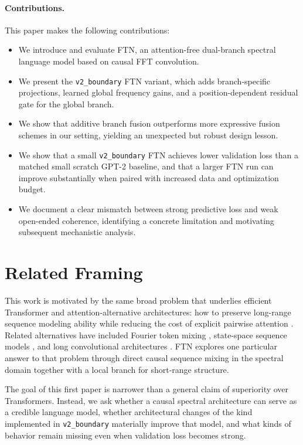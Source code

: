\documentclass[11pt]{article}
\begin{document}
\paragraph{Contributions.}
This paper makes the following contributions:
\begin{itemize}[leftmargin=1.5em]
    \item We introduce and evaluate FTN, an attention-free dual-branch spectral language model based on causal FFT convolution.
    \item We present the \texttt{v2\_boundary} FTN variant, which adds branch-specific projections, learned global frequency gains, and a position-dependent residual gate for the global branch.
    \item We show that additive branch fusion outperforms more expressive fusion schemes in our setting, yielding an unexpected but robust design lesson.
    \item We show that a small \texttt{v2\_boundary} FTN achieves lower validation loss than a matched small scratch GPT-2 baseline, and that a larger FTN run can improve substantially when paired with increased data and optimization budget.
    \item We document a clear mismatch between strong predictive loss and weak open-ended coherence, identifying a concrete limitation and motivating subsequent mechanistic analysis.
\end{itemize}

\section{Related Framing}
This work is motivated by the same broad problem that underlies efficient Transformer and attention-alternative architectures: how to preserve long-range sequence modeling ability while reducing the cost of explicit pairwise attention \cite{vaswani2017attention,katharopoulos2020transformers,choromanski2021performer}. Related alternatives have included Fourier token mixing \cite{leethorp2022fnet}, state-space sequence models \cite{gu2021ssm}, and long convolutional architectures \cite{poli2023hyena}. FTN explores one particular answer to that problem through direct causal sequence mixing in the spectral domain together with a local branch for short-range structure.

The goal of this first paper is narrower than a general claim of superiority over Transformers. Instead, we ask whether a causal spectral architecture can serve as a credible language model, whether architectural changes of the kind implemented in \texttt{v2\_boundary} materially improve that model, and what kinds of behavior remain missing even when validation loss becomes strong.
\end{document}

